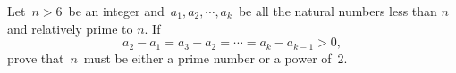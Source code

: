 Let $ \,n > 6\,$ be an integer and $ \,a_{1},a_{2},\cdots ,a_{k}\,$  be all the natural numbers less than $ n$ and relatively prime to $ n$. If\[ a_{2} - a_{1} = a_{3} - a_{2} = \cdots = a_{k} - a_{k - 1} > 0,
\]
prove that $ \,n\,$ must be either a prime number or a power of $ \,2$.

